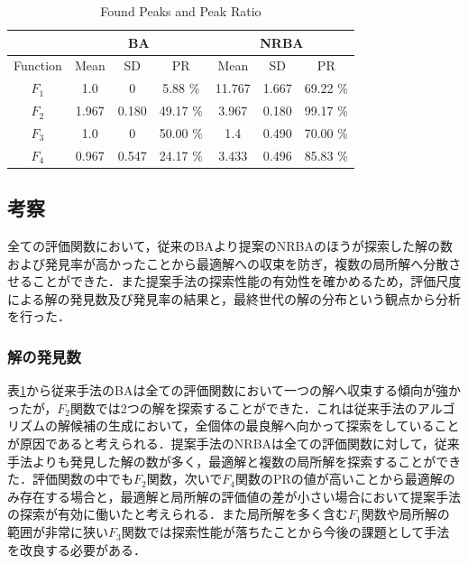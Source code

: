 \documentclass[a4j,11pt]{jarticle}
\begin{document}
\begin{table}[h]
\caption{Found Peaks and Peak Ratio}
\begin{center}
\begin{tabular}{c|c|c|c|c|c|c}
\hline
\multicolumn{1}{c|}{} & \multicolumn{3}{c|}{BA} & \multicolumn{3}{c}{NRBA}  \\
\hline
Function & Mean & SD & PR & Mean & SD & PR \\
\hline
$F_1$ & 1.0 & 0 & 5.88 \% & 11.767 & 1.667 & 69.22 \% \\
\hline
$F_2$ & 1.967 & 0.180 & 49.17 \% & 3.967 & 0.180 & 99.17 \% \\
\hline
$F_3$ & 1.0 & 0 & 50.00 \% & 1.4 & 0.490 & 70.00 \% \\
\hline
$F_4$ & 0.967 & 0.547 & 24.17 \% & 3.433 & 0.496 & 85.83 \% \\
\hline
\end{tabular}
\label{tab:nrba}
\end{center}
\end{table}

\subsection{考察}
\label{ss:nrba-disc}
全ての評価関数において，従来のBAより提案のNRBAのほうが探索した解の数および発見率が高かったことから最適解への収束を防ぎ，複数の局所解へ分散させることができた．また提案手法の探索性能の有効性を確かめるため，評価尺度による解の発見数及び発見率の結果と，最終世代の解の分布という観点から分析を行った．


\subsubsection{解の発見数}
\label{sss:nrba-pr} 
表\ref{tab:nrba}から従来手法のBAは全ての評価関数において一つの解へ収束する傾向が強かったが，$F_2$関数では2つの解を探索することができた．これは従来手法のアルゴリズムの解候補の生成において，全個体の最良解へ向かって探索をしていることが原因であると考えられる．提案手法のNRBAは全ての評価関数に対して，従来手法よりも発見した解の数が多く，最適解と複数の局所解を探索することができた．評価関数の中でも$F_2$関数，次いで$F_4$関数のPRの値が高いことから最適解のみ存在する場合と，最適解と局所解の評価値の差が小さい場合において提案手法の探索が有効に働いたと考えられる．また局所解を多く含む$F_1$関数や局所解の範囲が非常に狭い$F_3$関数では探索性能が落ちたことから今後の課題として手法を改良する必要がある．
\end{document}
